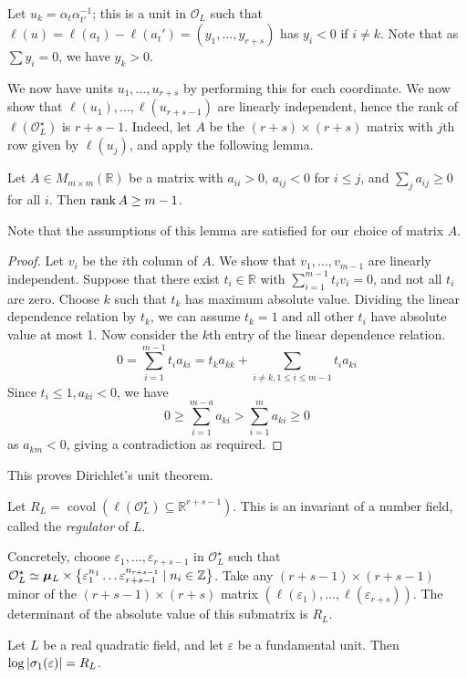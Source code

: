 Let \( u_k = \alpha_t \alpha_{t'}^{-1} \); this is a unit in \( \mathcal O_L \) such that \( \ell(u) = \ell(a_t) - \ell(a_t') = (y_1, \dots, y_{r+s}) \) has \( y_i < 0 \) if \( i \neq k \).
Note that as \( \sum y_i = 0 \), we have \( y_k > 0 \).

We now have units \( u_1, \dots, u_{r+s} \) by performing this for each coordinate.
We now show that \( \ell(u_1), \dots, \ell(u_{r+s-1}) \) are linearly independent, hence the rank of \( \ell(\mathcal O_L^\star) \) is \( r + s - 1 \).
Indeed, let \( A \) be the \( (r + s) \times (r + s) \) matrix with \( j \)th row given by \( \ell(u_j) \), and apply the following lemma.
\begin{lemma}
    Let \( A \in M_{m \times m}(\mathbb R) \) be a matrix with \( a_{ii} > 0 \), \( a_{ij} < 0 \) for \( i \leq j \), and \( \sum_j a_{ij} \geq 0 \) for all \( i \).
    Then \( \rank A \geq m - 1 \).
\end{lemma}
Note that the assumptions of this lemma are satisfied for our choice of matrix \( A \).
\begin{proof}
    Let \( v_i \) be the \( i \)th column of \( A \).
    We show that \( v_1, \dots, v_{m-1} \) are linearly independent.
    Suppose that there exist \( t_i \in \mathbb R \) with \( \sum_{i=1}^{m-1} t_i v_i = 0 \), and not all \( t_i \) are zero.
    Choose \( k \) such that \( t_k \) has maximum absolute value.
    Dividing the linear dependence relation by \( t_k \), we can assume \( t_k = 1 \) and all other \( t_i \) have absolute value at most 1.
    Now consider the \( k \)th entry of the linear dependence relation.
    \[ 0 = \sum_{i=1}^{m-1} t_i a_{ki} = t_k a_{kk} + \sum_{i \neq k, 1 \leq i \leq m-1} t_i a_{ki} \]
    Since \( t_i \leq 1, a_{ki} < 0 \), we have
    \[ 0 \geq \sum_{i=1}^{m-a} a_{ki} > \sum_{i=1}^m a_{ki} \geq 0 \]
    as \( a_{km} < 0 \), giving a contradiction as required.
\end{proof}
This proves Dirichlet's unit theorem.

\begin{definition}
    Let \( R_L = \operatorname{covol}(\ell(\mathcal O_L^\star) \subseteq \mathbb R^{r+s-1}) \).
    This is an invariant of a number field, called the \emph{regulator} of \( L \).
\end{definition}
Concretely, choose \( \varepsilon_1, \dots, \varepsilon_{r+s-1} \) in \( \mathcal O_L^\star \) such that \( \mathcal O_L^\star \simeq \bm\mu_L \times \qty{\varepsilon_1^{n_1} \dots \varepsilon_{r+s-1}^{n_{r+s-1}} \mid n_i \in \mathbb Z} \).
Take any \( (r+s-1) \times (r+s-1) \) minor of the \( (r+s-1)\times(r+s) \) matrix \( (\ell(\varepsilon_1), \dots, \ell(\varepsilon_{r+s})) \).
The determinant of the absolute value of this submatrix is \( R_L \).
\begin{example}
    Let \( L \) be a real quadratic field, and let \( \varepsilon \) be a fundamental unit.
    Then \( \log \abs{\sigma_1(\varepsilon)} = R_L \).
\end{example}

